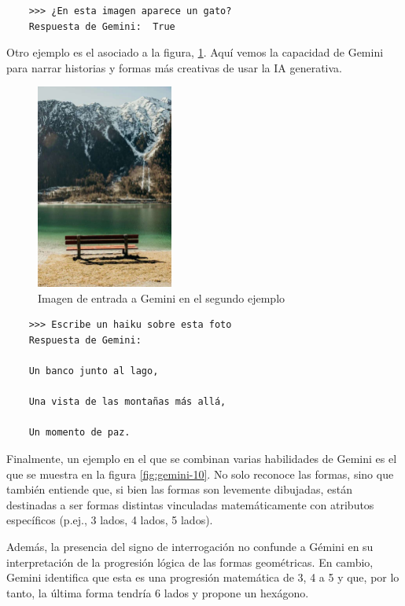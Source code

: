 \begin{verbatim}
	>>> ¿En esta imagen aparece un gato?
	Respuesta de Gemini:  True
\end{verbatim}

Otro ejemplo es el asociado a la figura, \ref{fig:gemini-9}. Aquí vemos la capacidad de Gemini para narrar historias y formas más creativas de usar la IA generativa. 

\begin{figure}[h]
	\centering
	\includegraphics[width=0.4\textwidth]{Imagenes/ImagenesGemini/gemini-9}
	\caption{Imagen de entrada a Gemini en el segundo ejemplo}
	\label{fig:gemini-9}
\end{figure}

\begin{verbatim}
	>>> Escribe un haiku sobre esta foto
	Respuesta de Gemini: 
	 
	Un banco junto al lago,
	
	Una vista de las montañas más allá,
	
	Un momento de paz.
\end{verbatim}
Finalmente, un ejemplo en el que se combinan varias habilidades de Gemini es el que se muestra en la figura \ref{fig:gemini-10}. No solo reconoce las formas, sino que también entiende que, si bien las formas son levemente dibujadas, están destinadas a ser formas distintas vinculadas matemáticamente con atributos específicos (p.ej., 3 lados, 4 lados, 5 lados).

Además, la presencia del signo de interrogación no confunde a Gémini en su interpretación de la progresión lógica de las formas geométricas. En cambio, Gemini identifica que esta es una progresión matemática de 3, 4 a 5 y que, por lo tanto, la última forma tendría 6 lados y propone un hexágono.

